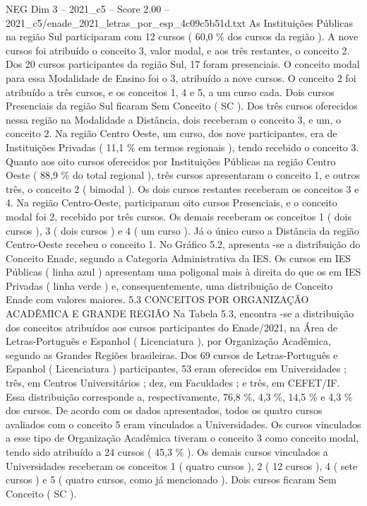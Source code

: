 \begin{textsample}{NEG Dim 3 – 2021\_c5 – Score 2.00 – 2021\_c5/enade\_2021\_letras\_por\_esp\_4c09c5b51d.txt}
As Instituições Públicas na região Sul participaram com 12 cursos ( 60,0 \% dos cursos da região ).
A nove cursos foi atribuído o conceito 3, valor modal, e aos três restantes, o conceito 2.
Dos 20 cursos participantes da região Sul, 17 foram presenciais.
O conceito modal para essa Modalidade de Ensino foi o 3, atribuído a nove cursos.
O conceito 2 foi atribuído a três cursos, e os conceitos 1, 4 e 5, a um curso cada.
Dois cursos Presenciais da região Sul ficaram Sem Conceito ( SC ).
Dos três cursos oferecidos nessa região na Modalidade a Distância, dois receberam o conceito 3, e um, o conceito 2.
Na região Centro Oeste, um curso, dos nove participantes, era de Instituições Privadas ( 11,1 \% em termos regionais ), tendo recebido o conceito 3.
Quanto aos oito cursos oferecidos por Instituições Públicas na região Centro Oeste ( 88,9 \% do total regional ), três cursos apresentaram o conceito 1, e outros três, o conceito 2 ( bimodal ).
Os dois cursos restantes receberam os conceitos 3 e 4.
Na região Centro-Oeste, participaram oito cursos Presenciais, e o conceito modal foi 2, recebido por três cursos.
Os demais receberam os conceitos 1 ( dois cursos ), 3 ( dois cursos ) e 4 ( um curso ).
Já o único curso a Distância da região Centro-Oeste recebeu o conceito 1.
No Gráfico 5.2, apresenta -se a distribuição do Conceito Enade, segundo a Categoria Administrativa da IES.
Os cursos em IES Públicas ( linha azul ) apresentam uma poligonal mais à direita do que os em IES Privadas ( linha verde ) e, consequentemente, uma distribuição de Conceito Enade com valores maiores. 5.3 CONCEITOS POR ORGANIZAÇÃO ACADÊMICA E GRANDE REGIÃO Na Tabela 5.3, encontra -se a distribuição dos conceitos atribuídos aos cursos participantes do Enade/2021, na Área de Letras-Português e Espanhol ( Licenciatura ), por Organização Acadêmica, segundo as Grandes Regiões brasileiras.
Dos 69 cursos de Letras-Português e Espanhol ( Licenciatura ) participantes, 53 eram oferecidos em Universidades ; três, em Centros Universitários ; dez, em Faculdades ; e três, em CEFET/IF.
Essa distribuição corresponde a, respectivamente, 76,8 \%, 4,3 \%, 14,5 \% e 4,3 \% dos cursos.
De acordo com os dados apresentados, todos os quatro cursos avaliados com o conceito 5 eram vinculados a Universidades.
Os cursos vinculados a esse tipo de Organização Acadêmica tiveram o conceito 3 como conceito modal, tendo sido atribuído a 24 cursos ( 45,3 \% ).
Os demais cursos vinculados a Universidades receberam os conceitos 1 ( quatro cursos ), 2 ( 12 cursos ), 4 ( sete cursos ) e 5 ( quatro cursos, como já mencionado ).
Dois cursos ficaram Sem Conceito ( SC ).

\end{textsample}
